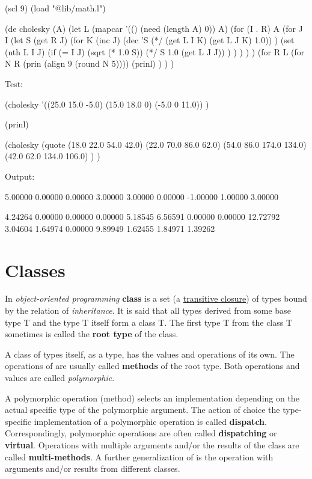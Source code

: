 \begin{wideverbatim}

(scl 9)
(load "@lib/math.l")

(de cholesky (A)
   (let L (mapcar '(() (need (length A) 0)) A)
      (for (I . R) A
         (for J I
            (let S (get R J)
               (for K (inc J)
                  (dec 'S (*/ (get L I K) (get L J K) 1.0)) )
               (set (nth L I J)
                  (if (= I J)
                     (sqrt (* 1.0 S))
                     (*/ S 1.0 (get L J J)) ) ) ) ) )
      (for R L
         (for N R (prin (align 9 (round N 5))))
         (prinl) ) ) )

Test:

(cholesky
   '((25.0 15.0 -5.0) (15.0 18.0 0) (-5.0 0 11.0)) )

(prinl)

(cholesky
   (quote
      (18.0  22.0   54.0   42.0)
      (22.0  70.0   86.0   62.0)
      (54.0  86.0  174.0  134.0)
      (42.0  62.0  134.0  106.0) ) )

Output:

  5.00000  0.00000  0.00000
  3.00000  3.00000  0.00000
 -1.00000  1.00000  3.00000

  4.24264  0.00000  0.00000  0.00000
  5.18545  6.56591  0.00000  0.00000
 12.72792  3.04604  1.64974  0.00000
  9.89949  1.62455  1.84971  1.39262

\end{wideverbatim}

\pagebreak{}
\section*{Classes}


In \emph{object-oriented programming} \textbf{class} is a set (a
\href{http://en.wikipedia.org/wiki/Transitive\_closure}{transitive
  closure}) of types bound by the relation of \emph{inheritance}. It
is said that all types derived from some base type T and the type T
itself form a class T. The first type T from the class T sometimes is
called the \textbf{root type} of the class.

A class of types itself, as a type, has the values and operations of
its own. The operations of are usually called \textbf{methods} of the
root type. Both operations and values are called \emph{polymorphic}.

A polymorphic operation (method) selects an implementation depending on
the actual specific type of the polymorphic argument. The action of
choice the type-specific implementation of a polymorphic operation is
called \textbf{dispatch}. Correspondingly, polymorphic operations are
often called \textbf{dispatching} or \textbf{virtual}. Operations with
multiple arguments and/or the results of the class are called
\textbf{multi-methods}. A further generalization of is the operation
with arguments and/or results from different classes.

